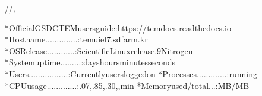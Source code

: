 \documentclass[a4paper,10pt,english]{sphinxmanual}
\begin{document}
\begin{sphinxVerbatim}[commandchars=\\\{\}]
\PYGZus{}\PYGZus{}\PYGZus{}\PYGZus{}\PYGZus{}\PYGZus{}\PYGZus{}/\PYGZus{}\PYGZus{}\PYGZus{}\PYGZus{}/\PYGZus{}\PYGZus{}\PYGZus{}\PYGZus{}\PYGZus{}\PYGZus{}\PYGZus{}\PYGZus{}\PYGZus{}\PYGZus{}\PYGZus{}\PYGZus{}\PYGZus{},\PYGZus{}\PYGZus{}\PYGZus{}\PYGZus{}\PYGZus{}

*OfficialGSDCTEMusersguide:https://tem\PYGZhy{}docs.readthedocs.io
*Hostname..............:tem\PYGZhy{}ui\PYGZhy{}el7.sdfarm.kr
*OSRelease............:ScientificLinuxrelease.9Nitrogen
*Systemuptime.........:dayshoursminutesseconds
*Users.................:Currentlyusersloggedon
*Processes.............:running
*CPUusage.............:.07,.85,.30,,min
*Memoryused/total...:MB/MB

\end{sphinxVerbatim}
\end{document}

